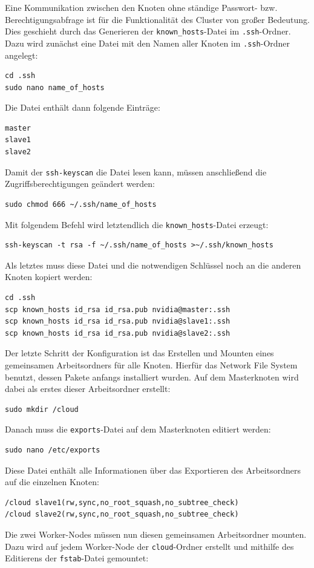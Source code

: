 \documentclass[doktyp=semarbeit, sprache=german]{TUBAFarbeiten}
\begin{document}
Eine Kommunikation zwischen den Knoten ohne ständige Passwort- bzw. Berechtigungsabfrage ist für die Funktionalität des Cluster von großer Bedeutung. Dies geschieht durch das Generieren der \texttt{known\_hosts}-Datei im \texttt{.ssh}-Ordner.  Dazu wird zunächst eine Datei mit den Namen aller Knoten im \texttt{.ssh}-Ordner angelegt:
\begin{lstlisting}
cd .ssh
sudo nano name_of_hosts
\end{lstlisting}
Die Datei enthält dann folgende Einträge:
\begin{lstlisting}
master
slave1
slave2
\end{lstlisting}
Damit der \texttt{ssh-keyscan} die Datei lesen kann, müssen anschließend die Zugriffsberechtigungen geändert werden:
\begin{lstlisting}
sudo chmod 666 ~/.ssh/name_of_hosts
\end{lstlisting}
Mit folgendem Befehl wird letztendlich die \texttt{known\_hosts}-Datei erzeugt:
\begin{lstlisting}
ssh-keyscan -t rsa -f ~/.ssh/name_of_hosts >~/.ssh/known_hosts
\end{lstlisting}
Als letztes muss diese Datei und die notwendigen Schlüssel noch an die anderen Knoten kopiert werden:
\begin{lstlisting}
cd .ssh
scp known_hosts id_rsa id_rsa.pub nvidia@master:.ssh
scp known_hosts id_rsa id_rsa.pub nvidia@slave1:.ssh
scp known_hosts id_rsa id_rsa.pub nvidia@slave2:.ssh
\end{lstlisting}
Der letzte Schritt der Konfiguration ist das Erstellen und Mounten eines gemeinsamen Arbeitsordners für alle Knoten. Hierfür das Network File System benutzt, dessen Pakete anfangs installiert wurden. Auf dem Masterknoten wird dabei als erstes dieser Arbeitsordner erstellt:
\begin{lstlisting}
sudo mkdir /cloud
\end{lstlisting}
Danach muss die \texttt{exports}-Datei auf dem Masterknoten editiert werden:
\begin{lstlisting}
sudo nano /etc/exports
\end{lstlisting}
Diese Datei enthält alle Informationen über das Exportieren des Arbeitsordners auf die einzelnen Knoten:
\begin{lstlisting}
/cloud slave1(rw,sync,no_root_squash,no_subtree_check)
/cloud slave2(rw,sync,no_root_squash,no_subtree_check)
\end{lstlisting}
Die zwei Worker-Nodes müssen nun diesen gemeinsamen Arbeitsordner mounten. Dazu wird auf jedem Worker-Node der \texttt{cloud}-Ordner erstellt und mithilfe des Editierens der \texttt{fstab}-Datei gemountet:
\end{document}
